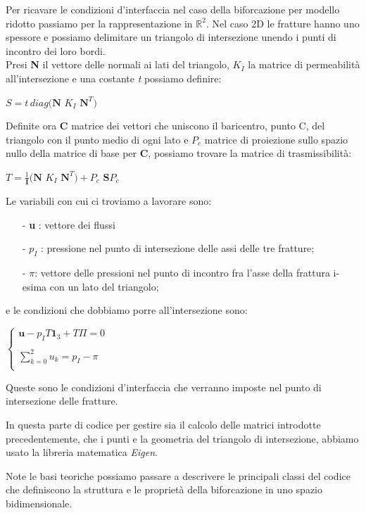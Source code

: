 Per ricavare le condizioni d'interfaccia nel caso della biforcazione per modello ridotto passiamo per la rappresentazione in $\mathbb{R}^{2}$.
Nel caso 2D le fratture hanno uno spessore e possiamo delimitare un triangolo di intersezione unendo i punti di incontro dei loro bordi. \\
Presi \textbf{N} il vettore delle normali ai lati del triangolo, \textbf{$K_{I}$} la matrice di permeabilit\`{a} all'intersezione e una costante \textit{t} possiamo definire:
\begin{center}
	$ S = \textit{t} \, diag( \textbf{N}$ \textbf{$K_{I}$} $ \textbf{N}^{T} ) $
\end{center}
Definite ora \textbf{C} matrice dei vettori che uniscono il baricentro, punto C, del triangolo con il punto medio  di ogni lato e \textbf{$P_{c}$} matrice di proiezione sullo spazio nullo della matrice di base per \textbf{C}, possiamo trovare la matrice di trasmissibilit\`{a}:
\begin{center}
	$ T = \frac{1}{\textbf{I}}( \textbf{N}$ \textbf{$K_{I}$} $ \textbf{N}^{T} ) + $\textbf{$P_{c}$} $\textbf{S}$\textbf{$P_{c}$}
\end{center}
Le variabili con cui ci troviamo a lavorare sono:
	\begin{enumerate}
	\item[-] \textbf{u} : vettore dei flussi
	\item[-] $p_{I}$ :  pressione nel punto di intersezione delle assi delle tre fratture;
	\item[-] \textbf{$\pi$}: vettore delle pressioni nel punto di incontro fra l'asse della frattura i-esima con un lato del triangolo;
	\end{enumerate} 
e le condizioni che dobbiamo porre all'intersezione sono:
\begin{center}			
	$\left \{
		\begin{array}{l}	
	 		\textbf{u} - p_{I}T\textbf{1}_{3}+T\Pi=0  \\ \\
     	 	\sum_{k=0}^2 u_{k} = p_{I} - \pi  \\
		\end{array}
	\right.$
\end{center} \label{condizioniinterfaccia}

\noindent  Queste sono le condizioni d'interfaccia che verranno imposte nel punto di intersezione delle fratture.\\ 
\par In questa parte di codice per gestire sia il calcolo delle matrici introdotte precedentemente, che i punti e la geometria del triangolo di intersezione, abbiamo usato la libreria matematica \textit{Eigen}.\\
\par Note le basi teoriche possiamo passare a descrivere le principali classi del codice che definiscono la struttura e le propriet\`{a} della biforcazione in uno spazio bidimensionale.


